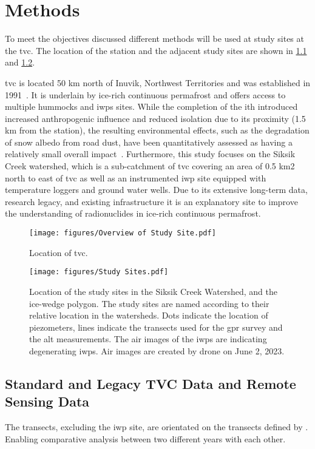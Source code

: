 \chapter{Methods}
To meet the objectives discussed different methods will be used at study sites at the \gls{tvc}. 
The location of the station and the adjacent study sites are shown in \cref{fig:study_site_overview} and \cref{fig:study_sites}.

\gls{tvc} is located 50 km north of Inuvik, Northwest Territories and was established in 1991~\citep{trailvalleycreekTrailValleyCreek2025}. 
It is underlain by ice-rich continuous permafrost and offers access to multiple hummocks and \glspl{iwp} sites. While the completion of the \gls{ith} introduced increased anthropogenic influence and reduced isolation due to its proximity (1.5 km from the station), the resulting environmental effects, such as the degradation of snow albedo from road dust, have been quantitatively assessed as having a relatively small overall impact~\citep{hammarSnowAccumulationAlbedo2023}. 
Furthermore, this study focuses on the Siksik Creek watershed, which is a sub-catchment of \gls{tvc} covering an area of 0.5 km2 north to east of \gls{tvc} as well as an instrumented \gls{iwp} site equipped with temperature loggers and ground water wells. 
Due to its extensive long-term data, research legacy, and existing infrastructure it is an explanatory site to improve the understanding of radionuclides in ice-rich continuous permafrost.
\begin{figure}[htbp]
    \centering
    \texttt{[image: figures/Overview of Study Site.pdf]}
    \caption{Location of \gls{tvc}.}\label{fig:study_site_overview}
\end{figure}
\begin{figure}[htbp]
    \centering
    \texttt{[image: figures/Study Sites.pdf]}
    \caption[Location of study sites around \gls{tvc}.]{Location of the study sites in the Siksik Creek Watershed, and the ice-wedge polygon. 
        The study sites are named according to their relative location in the watersheds. 
        Dots indicate the location of piezometers, lines indicate the transects used for the \gls{gpr} survey and the \gls{alt} measurements. 
        The air images of the \glspl{iwp} are indicating degenerating \glspl{iwp}. Air images are created by drone on June 2, 2023.}\label{fig:study_sites}
\end{figure}
\section{Standard and Legacy TVC Data and Remote Sensing Data}
The transects, excluding the \gls{iwp} site, are orientated on the transects defined by \citet{dakinHowDryYear2023}. 
Enabling comparative analysis between two different years with each other. 

